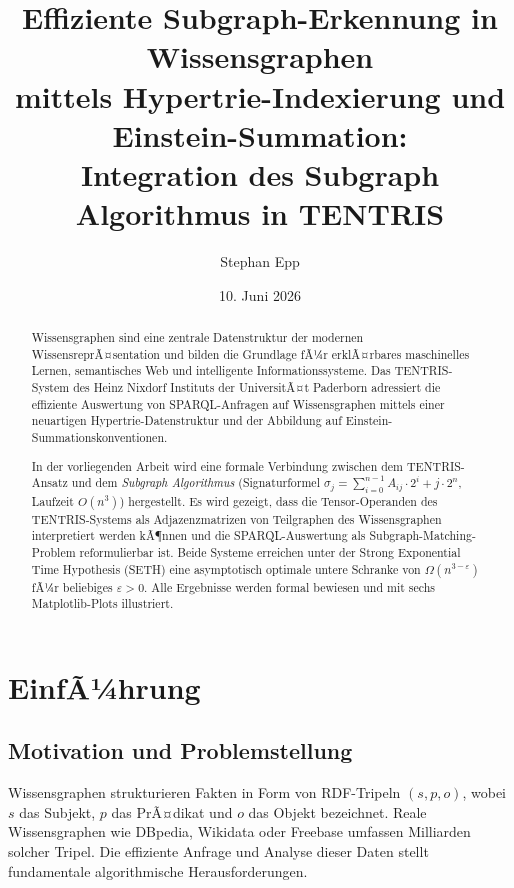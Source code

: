 ﻿\documentclass[a4paper,12pt]{article}
\title{\textbf{Effiziente Subgraph-Erkennung in Wissensgraphen\\
mittels Hypertrie-Indexierung und Einstein-Summation:\\
Integration des Subgraph Algorithmus in TENTRIS}}
\author{Stephan Epp}
\date{10. Juni 2026}
\theoremstyle{definition}
\begin{document}
\maketitle

\begin{abstract}
Wissensgraphen sind eine zentrale Datenstruktur der modernen WissensreprÃ¤sentation und bilden
die Grundlage fÃ¼r erklÃ¤rbares maschinelles Lernen, semantisches Web und intelligente
Informationssysteme. Das TENTRIS-System des Heinz Nixdorf Instituts der UniversitÃ¤t Paderborn
adressiert die effiziente Auswertung von SPARQL-Anfragen auf Wissensgraphen mittels einer
neuartigen Hypertrie-Datenstruktur und der Abbildung auf Einstein-Summationskonventionen.

In der vorliegenden Arbeit wird eine formale Verbindung zwischen dem TENTRIS-Ansatz und dem
\emph{Subgraph Algorithmus} (Signaturformel $\sigma_j = \sum_{i=0}^{n-1} A_{ij} \cdot 2^i +
j \cdot 2^n$, Laufzeit $O(n^3)$) hergestellt. Es wird gezeigt, dass die Tensor-Operanden
des TENTRIS-Systems als Adjazenzmatrizen von Teilgraphen des Wissensgraphen interpretiert
werden kÃ¶nnen und die SPARQL-Auswertung als Subgraph-Matching-Problem reformulierbar ist.
Beide Systeme erreichen unter der Strong Exponential Time Hypothesis (SETH) eine
asymptotisch optimale untere Schranke von $\Omega(n^{3-\varepsilon})$ fÃ¼r beliebiges
$\varepsilon > 0$. Alle Ergebnisse werden formal bewiesen und mit sechs Matplotlib-Plots
illustriert.
\end{abstract}

\tableofcontents
\newpage

\section{EinfÃ¼hrung}

\subsection{Motivation und Problemstellung}

Wissensgraphen strukturieren Fakten in Form von RDF-Tripeln $(s, p, o)$, wobei $s$ das
Subjekt, $p$ das PrÃ¤dikat und $o$ das Objekt bezeichnet. Reale Wissensgraphen wie DBpedia,
Wikidata oder Freebase umfassen Milliarden solcher Tripel. Die effiziente Anfrage und
Analyse dieser Daten stellt fundamentale algorithmische Herausforderungen.
\end{document}
